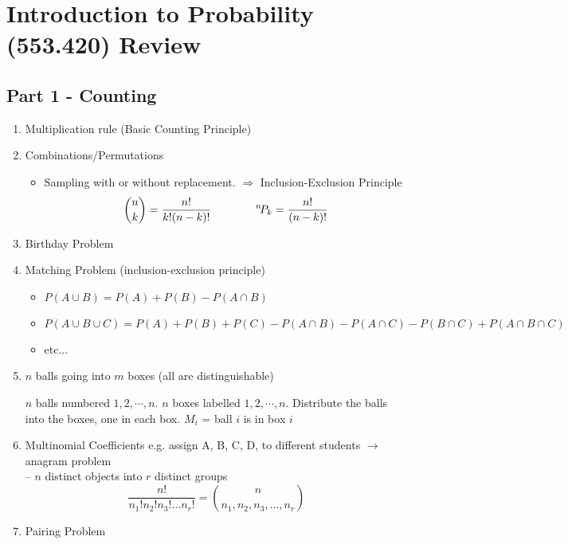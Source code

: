 \section*{Introduction to Probability (553.420) Review}
\subsection*{Part 1 - Counting}
\begin{enumerate}[label=\protect\circled{\arabic*}]
	\item Multiplication rule (Basic Counting Principle)
	\item Combinations/Permutations
	\begin{itemize}
		\item Sampling with or without replacement. $\Rightarrow$ Inclusion-Exclusion Principle
	\begin{equation*}
		\binom{n}{k} = \frac{n!}{k!(n-k)!} \qquad \qquad {}^{n}\!P_{k} = \frac{n!}{(n-k)!}
	\end{equation*}
	\end{itemize}
	\item Birthday Problem
	\item Matching Problem (inclusion-exclusion principle)
	\begin{itemize}[label={--}]
		\item $P(A \cup B) = P(A) + P(B) - P(A \cap B)$
		\item $P(A \cup B \cup C) = P(A) + P(B) + P(C) - P(A \cap B) - P(A \cap C) - P(B \cap C) + P(A \cap B \cap C)$  
		\item etc...
	\end{itemize}
	\item $n$ balls going into $m$ boxes (all are distinguishable)
	\begin{example}
		$n$ balls numbered $1,2,\cdots, n$. $n$ boxes labelled $1,2,\cdots, n$. Distribute the balls into the boxes, one in each box. $M_i$ = ball $i$ is in box $i$
	\end{example}
	\item Multinomial Coefficients e.g. assign A, B, C, D, to different students $\rightarrow$ anagram problem\\ -- $n$ distinct objects into $r$ distinct groups
	\begin{equation*}
		\frac{n!}{n_1! n_2! n_3! \ldots n_r!} = \binom{n}{n_1, n_2, n_3, \ldots, n_r}
	\end{equation*}
	\item Pairing Problem
	\begin{equation*}

\end{equation*}
\end{enumerate}
